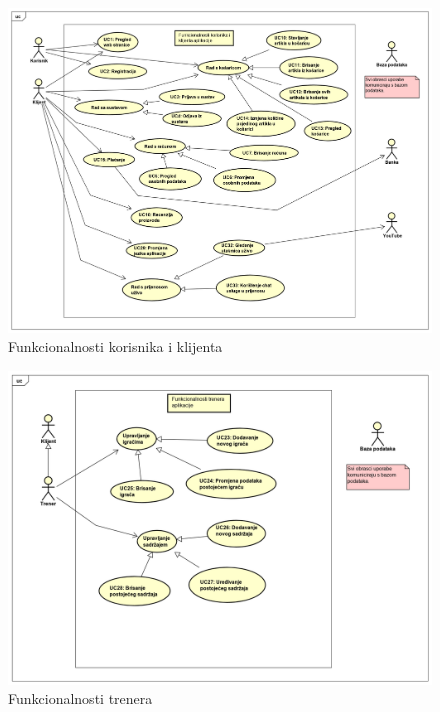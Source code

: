 				
					
					\begin{figure}[H]
						\includegraphics[width=\linewidth]{dijagrami/Funkcionalnosti_korisnika_i_klijenta.png}
						\centering
						\caption{Funkcionalnosti korisnika i klijenta}
						\label{fig:UseCaseDiagram1}
					\end{figure}
				
					\begin{figure}[H]
						\includegraphics[width=\linewidth]{dijagrami/Funkcionalnosti_trenera.png}
						\centering
						\caption{Funkcionalnosti trenera}
						\label{fig:UseCaseDiagram2}
					\end{figure}
				

